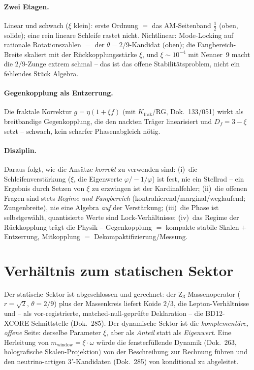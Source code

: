 \paragraph{Zwei Etagen.} Linear und schwach ($\xi$ klein): erste Ordnung $=$ das AM-Seitenband
$\tfrac12$ (oben, solide); eine rein lineare Schleife rastet nicht. Nichtlinear: Mode-Locking auf
rationale Rotationszahlen $=$ der $\theta=2/9$-Kandidat (oben); die Fangbereich-Breite skaliert mit der
Rückkopplungsstärke $\xi$, und $\xi\sim10^{-4}$ mit Nenner~9 macht die $2/9$-Zunge extrem schmal -- das
ist das offene Stabilitätsproblem, nicht ein fehlendes Stück Algebra.

\paragraph{Gegenkopplung als Entzerrung.} Die fraktale Korrektur $g=\eta(1+\xi f)$ (mit
$K_{\text{frak}}$/RG, Dok.~133/051) wirkt als breitbandige Gegenkopplung, die den nackten Träger
linearisiert und $D_f=3-\xi$ setzt -- schwach, kein scharfer Phasenabgleich nötig.

\paragraph{Disziplin.} Daraus folgt, wie die Ansätze \emph{korrekt} zu verwenden sind: (i)~die
Schleifenverstärkung ($\xi$, die Eigenwerte $\varphi/{-}1/\varphi$) ist fest, nie ein Stellrad -- ein
Ergebnis durch Setzen von $\xi$ zu erzwingen ist der Kardinalfehler; (ii)~die offenen Fragen sind stets
\emph{Regime und Fangbereich} (kontrahierend/marginal/weglaufend; Zungenbreite), nie eine Algebra
\emph{auf} der Verstärkung; (iii)~die Phase ist selbstgewählt, quantisierte Werte sind
Lock-Verhältnisse; (iv)~das Regime der Rückkopplung trägt die Physik -- Gegenkopplung $=$ kompakte
stabile Skalen $+$ Entzerrung, Mitkopplung $=$ Dekompaktifizierung/Messung.

\section{Verhältnis zum statischen Sektor}
Der statische Sektor ist abgeschlossen und gerechnet: der Z$_3$-Massenoperator ($r=\sqrt2$,
$\theta=2/9$) plus der Massenkreis liefert Koide $2/3$, die Lepton-Verhältnisse und -- als
vor-registrierte, matched-null-geprüfte Deklaration -- die BD12-XCORE-Schnittstelle (Dok.~285). Der
dynamische Sektor ist die \emph{komplementäre, offene} Seite: derselbe Parameter $\xi$, aber als
\emph{Anteil} statt als \emph{Eigenwert}. Eine Herleitung von $m_{\text{window}}=\xi\cdot\omega$
würde die fensterfüllende Dynamik (Dok.~263, holografische Skalen-Projektion) von der Beschreibung
zur Rechnung führen und den neutrino-artigen $3'$-Kandidaten (Dok.~285) von konditional zu abgeleitet.

